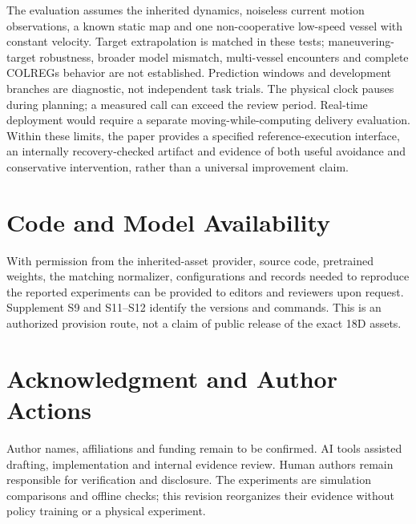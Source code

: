 \documentclass[conference]{IEEEtran}
\begin{document}
The evaluation assumes the inherited dynamics, noiseless current motion observations, a known static map and one non-cooperative low-speed vessel with constant velocity. Target extrapolation is matched in these tests; maneuvering-target robustness, broader model mismatch, multi-vessel encounters and complete COLREGs behavior are not established. Prediction windows and development branches are diagnostic, not independent task trials. The physical clock pauses during planning; a measured call can exceed the review period. Real-time deployment would require a separate moving-while-computing delivery evaluation. Within these limits, the paper provides a specified reference-execution interface, an internally recovery-checked artifact and evidence of both useful avoidance and conservative intervention, rather than a universal improvement claim.

\section{Code and Model Availability}

With permission from the inherited-asset provider, source code, pretrained weights, the matching normalizer, configurations and records needed to reproduce the reported experiments can be provided to editors and reviewers upon request. Supplement S9 and S11--S12 identify the versions and commands. This is an authorized provision route, not a claim of public release of the exact 18D assets.

\section*{Acknowledgment and Author Actions}

Author names, affiliations and funding remain to be confirmed. AI tools assisted drafting, implementation and internal evidence review. Human authors remain responsible for verification and disclosure. The experiments are simulation comparisons and offline checks; this revision reorganizes their evidence without policy training or a physical experiment.
\end{document}
